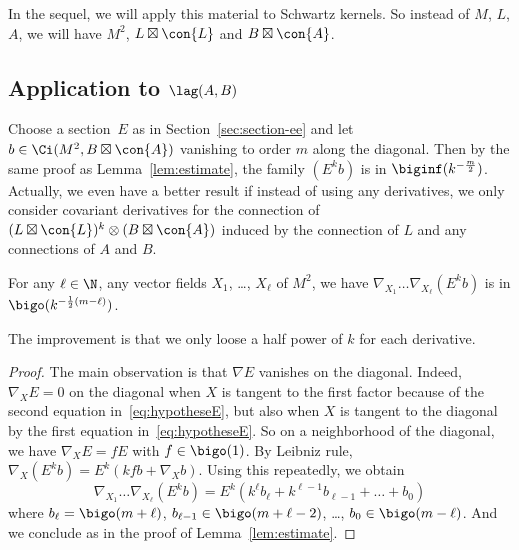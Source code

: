 In the sequel, we will apply this material to Schwartz kernels. So instead of $M$, $L$, $A$, we will have $M^2$, $L \boxtimes \con{L}$ and $B
\boxtimes \con{A}$. 

\subsection{Application to \texorpdfstring{$\lag (A,B)$}{L(A,B)}}

Choose a section~$E$ as in Section~\ref{sec:section-ee} and let $b \in \Ci (M^2, B \boxtimes \con{A})$ vanishing to order $m$ along the diagonal. Then by the same proof as Lemma~\ref{lem:estimate}, the family $ (E^k b)$ is in $\biginf (k^{-\frac{m}{2}})$. Actually, we even have a better result if instead of using any derivatives, we only consider covariant derivatives for the connection of $(L \boxtimes \con{L})^k \otimes (B \boxtimes \con{A})$ induced by the connection of $L$ and any connections of $A$ and $B$.

\begin{lemm}\label{lem:comp_der_lag}
For any $\ell \in \N$, any vector fields $X_1$, \ldots, $X_{\ell}$ of $M^2$, we have $ \nabla _{X_1} \ldots \nabla_{X_\ell} (E^k b) $ is in $\bigo (k^{-\frac{1}{2} (m - \ell)})$.
\end{lemm}

The improvement is that we only loose a half power of $k$ for each derivative.

\begin{proof}
The main observation is that $\nabla E $ vanishes on the
diagonal. Indeed, $\nabla_{X} E =0$ on the diagonal when $X$ is tangent to the first factor because of the second equation in~\eqref{eq:hypotheseE}, but also when $X$ is tangent to the diagonal by the first equation in~\eqref{eq:hypotheseE}. So on a neighborhood of the diagonal, we have  $\nabla_X E = f E$  with $f \in \bigo (1)$. By Leibniz rule, $ \nabla_X (E^k b) = E^k (k f b + \nabla_X b) $. Using this repeatedly, we obtain
\[
\nabla _{X_1} \ldots \nabla_{X_\ell} \left(E^k b\right) = E^k \left(k^{\ell} b_{\ell} +
k^{\ell -1} b_{\ell-1} + \ldots + b_0\right)
\]
where
$ b_{\ell} = \bigo (m+ \ell)$, $b_{\ell-1 } \in \bigo (m+ \ell - 2)$,
\ldots, $b_0 \in \bigo (m - \ell)$. And we conclude as in the proof of Lemma~\ref{lem:estimate}.
\end{proof}

